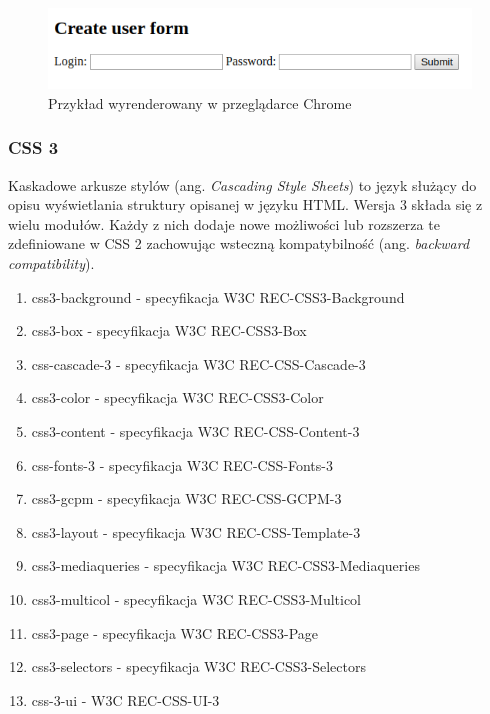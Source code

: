\documentclass[polish, twoside, 12pt]{mwart}
\begin{document}
\begin{figure}[ht]
  \includegraphics[width=\textwidth]{html-chrome.png}
	\caption{Przykład wyrenderowany w przeglądarce Chrome}
\end{figure}

\subsubsection{CSS 3}

Kaskadowe arkusze stylów (ang. \emph{Cascading Style Sheets}) to język służący do opisu wyświetlania struktury opisanej w języku HTML. Wersja 3 składa się z wielu modułów. Każdy z nich dodaje nowe możliwości lub rozszerza te zdefiniowane w CSS 2 zachowując wsteczną kompatybilność (ang. \emph{backward compatibility}).

\begin{enumerate}
  \item css3-background - specyfikacja W3C REC-CSS3-Background \cite{w3c-rec-css3-background}
  \item css3-box - specyfikacja W3C REC-CSS3-Box \cite{w3c-rec-css3-box}
  \item css-cascade-3 - specyfikacja W3C REC-CSS-Cascade-3 \cite{w3c-rec-css3-cascade}
  \item css3-color - specyfikacja W3C REC-CSS3-Color \cite{w3c-rec-css3-color}
  \item css3-content - specyfikacja W3C REC-CSS-Content-3 \cite{w3c-rec-css3-content}
  \item css-fonts-3 - specyfikacja W3C REC-CSS-Fonts-3 \cite{w3c-rec-css3-fonts}
  \item css3-gcpm - specyfikacja W3C REC-CSS-GCPM-3 \cite{w3c-rec-css3-gcpm}
  \item css3-layout - specyfikacja W3C REC-CSS-Template-3 \cite{w3c-rec-css3-template}
  \item css3-mediaqueries - specyfikacja W3C REC-CSS3-Mediaqueries \cite{w3c-rec-css3-mediaqueries}
  \item css3-multicol - specyfikacja W3C REC-CSS3-Multicol \cite{w3c-rec-css3-multicol}
  \item css3-page - specyfikacja W3C REC-CSS3-Page \cite{w3c-rec-css3-page}
  \item css3-selectors - specyfikacja W3C REC-CSS3-Selectors \cite{w3c-rec-css3-selectors}
  \item css-3-ui - W3C REC-CSS-UI-3 \cite{w3c-rec-css3-ui}
\end{enumerate}
\end{document}
